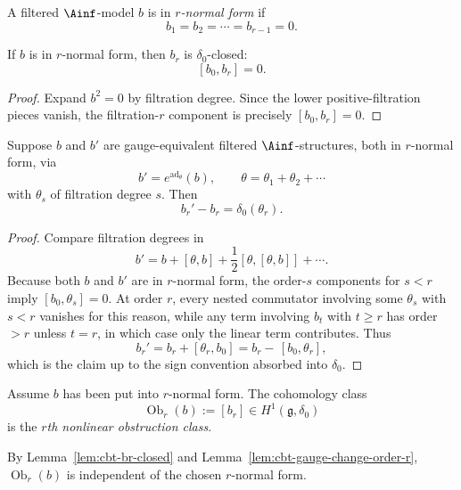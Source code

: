 \begin{definition}
\label{def:cbt-r-normal-form}
A filtered $\Ainf$-model $b$ is in \emph{$r$-normal form} if
\[
b_1=b_2=\cdots=b_{r-1}=0.
\]
\end{definition}

\begin{lemma}
\label{lem:cbt-br-closed}
\ClaimStatusProvedHere
If $b$ is in $r$-normal form, then $b_r$ is $\delta_0$-closed:
\[
[b_0,b_r]=0.
\]
\end{lemma}

\begin{proof}
Expand $b^2=0$ by filtration degree. Since the lower positive-filtration pieces vanish, the filtration-$r$ component is precisely $[b_0,b_r]=0$.
\end{proof}

\begin{lemma}
\label{lem:cbt-gauge-change-order-r}
\ClaimStatusProvedHere
Suppose $b$ and $b'$ are gauge-equivalent filtered $\Ainf$-structures, both in $r$-normal form, via
\[
b'=e^{\operatorname{ad}_\theta}(b),
\qquad
\theta=\theta_1+\theta_2+\cdots
\]
with $\theta_s$ of filtration degree $s$. Then
\[
b_r'-b_r=\delta_0(\theta_r).
\]
\end{lemma}

\begin{proof}
Compare filtration degrees in
\[
b'=b+[\theta,b]+\frac12[\theta,[\theta,b]]+\cdots.
\]
Because both $b$ and $b'$ are in $r$-normal form, the order-$s$ components for $s<r$ imply $[b_0,\theta_s]=0$. At order $r$, every nested commutator involving some $\theta_s$ with $s<r$ vanishes for this reason, while any term involving $b_t$ with $t\ge r$ has order $>r$ unless $t=r$, in which case only the linear term contributes. Thus
\[
b_r'=b_r+[\theta_r,b_0]=b_r-\,[b_0,\theta_r],
\]
which is the claim up to the sign convention absorbed into $\delta_0$.
\end{proof}

\begin{definition}
\label{def:cbt-obstruction-classes}
Assume $b$ has been put into $r$-normal form. The cohomology class
\[
\operatorname{Ob}_r(b):=[b_r]\in H^1(\mathfrak g,\delta_0)
\]
is the \emph{$r$th nonlinear obstruction class}.
\end{definition}

By Lemma~\ref{lem:cbt-br-closed} and Lemma~\ref{lem:cbt-gauge-change-order-r}, $\operatorname{Ob}_r(b)$ is independent of the chosen $r$-normal form.

